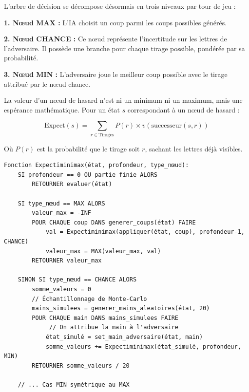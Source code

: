 \documentclass[a4paper]{article}
\begin{document}
\vspace{1\baselineskip}
\hangindent=0.8mm
L'arbre de décision se décompose désormais en trois niveaux par tour de jeu :

\hangindent=1.5cm
\textbf{1. Nœud MAX :} L'IA choisit un coup parmi les coups possibles générés.

\vspace{1\baselineskip}
\hangindent=1.5cm
\textbf{2. Nœud CHANCE :} Ce nœud représente l'incertitude sur les lettres de l'adversaire. Il possède une branche pour chaque tirage possible, pondérée par sa probabilité.

\vspace{1\baselineskip}
\hangindent=1.5cm
\textbf{3. Nœud MIN :} L'adversaire joue le meilleur coup possible avec le tirage attribué par le nœud chance.

\hangindent=0.8mm
La valeur d'un nœud de hasard n'est ni un minimum ni un maximum, mais une espérance mathématique. Pour un état $s$ correspondant à un nœud de hasard :

\[
\text{Expect}(s) = \sum_{r \in \text{Tirages}} P(r) \times v(\text{successeur}(s, r))
\]

\hangindent=4cm
Où $P(r)$ est la probabilité que le tirage soit $r$, sachant les lettres déjà visibles.

\begin{besoinbox}
\label{lst:expectiminimax}
\begin{verbatim}
Fonction Expectiminimax(état, profondeur, type_nœud):
    SI profondeur == 0 OU partie_finie ALORS
        RETOURNER evaluer(état)

    SI type_nœud == MAX ALORS
        valeur_max = -INF
        POUR CHAQUE coup DANS generer_coups(état) FAIRE
            val = Expectiminimax(appliquer(état, coup), profondeur-1, CHANCE)
            valeur_max = MAX(valeur_max, val)
        RETOURNER valeur_max

    SINON SI type_nœud == CHANCE ALORS
        somme_valeurs = 0
        // Échantillonnage de Monte-Carlo
        mains_simulees = generer_mains_aleatoires(état, 20)
        POUR CHAQUE main DANS mains_simulees FAIRE
             // On attribue la main à l'adversaire
            état_simulé = set_main_adversaire(état, main)
            somme_valeurs += Expectiminimax(état_simulé, profondeur, MIN)
        RETOURNER somme_valeurs / 20

    // ... Cas MIN symétrique au MAX
\end{verbatim}
\end{besoinbox}
\end{document}
